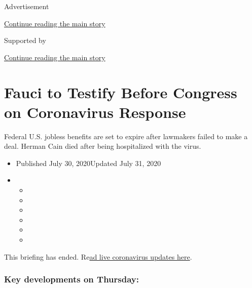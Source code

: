 Advertisement

\protect\hyperlink{after-top}{Continue reading the main story}

Supported by

\protect\hyperlink{after-sponsor}{Continue reading the main story}

\hypertarget{fauci-to-testify-before-congress-on-coronavirus-response}{%
\section{Fauci to Testify Before Congress on Coronavirus
Response}\label{fauci-to-testify-before-congress-on-coronavirus-response}}

Federal U.S. jobless benefits are set to expire after lawmakers failed
to make a deal. Herman Cain died after being hospitalized with the
virus.

\begin{itemize}
\item
  Published July 30, 2020Updated July 31, 2020
\item
  \begin{itemize}
  \item
  \item
  \item
  \item
  \item
  \item
  \end{itemize}
\end{itemize}

This briefing has ended.
Re\href{https://www.nytimes3xbfgragh.onion/2020/07/31/world/coronavirus-covid-19.html}{ad
live coronavirus updates here}.

\hypertarget{key-developments-on-thursday}{%
\subsubsection{Key developments on
Thursday:}\label{key-developments-on-thursday}}

